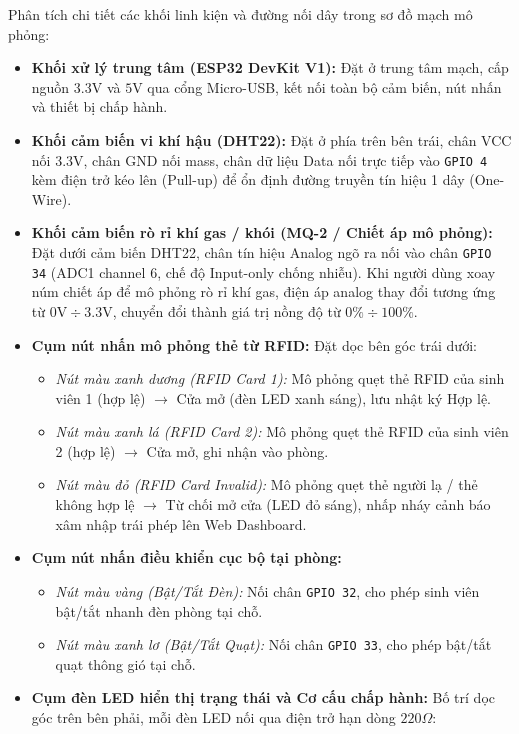 Phân tích chi tiết các khối linh kiện và đường nối dây trong sơ đồ mạch mô phỏng:
\begin{itemize}
    \item \textbf{Khối xử lý trung tâm (ESP32 DevKit V1):} Đặt ở trung tâm mạch, cấp nguồn $3.3\text{V}$ và $5\text{V}$ qua cổng Micro-USB, kết nối toàn bộ cảm biến, nút nhấn và thiết bị chấp hành.
    \item \textbf{Khối cảm biến vi khí hậu (DHT22):} Đặt ở phía trên bên trái, chân VCC nối $3.3\text{V}$, chân GND nối mass, chân dữ liệu Data nối trực tiếp vào \texttt{GPIO 4} kèm điện trở kéo lên (Pull-up) để ổn định đường truyền tín hiệu 1 dây (One-Wire).
    \item \textbf{Khối cảm biến rò rỉ khí gas / khói (MQ-2 / Chiết áp mô phỏng):} Đặt dưới cảm biến DHT22, chân tín hiệu Analog ngõ ra nối vào chân \texttt{GPIO 34} (ADC1 channel 6, chế độ Input-only chống nhiễu). Khi người dùng xoay núm chiết áp để mô phỏng rò rỉ khí gas, điện áp analog thay đổi tương ứng từ $0\text{V} \div 3.3\text{V}$, chuyển đổi thành giá trị nồng độ từ $0\% \div 100\%$.
    \item \textbf{Cụm nút nhấn mô phỏng thẻ từ RFID:} Đặt dọc bên góc trái dưới:
    \begin{itemize}
        \item \textit{Nút màu xanh dương (RFID Card 1):} Mô phỏng quẹt thẻ RFID của sinh viên 1 (hợp lệ) $\rightarrow$ Cửa mở (đèn LED xanh sáng), lưu nhật ký Hợp lệ.
        \item \textit{Nút màu xanh lá (RFID Card 2):} Mô phỏng quẹt thẻ RFID của sinh viên 2 (hợp lệ) $\rightarrow$ Cửa mở, ghi nhận vào phòng.
        \item \textit{Nút màu đỏ (RFID Card Invalid):} Mô phỏng quẹt thẻ người lạ / thẻ không hợp lệ $\rightarrow$ Từ chối mở cửa (LED đỏ sáng), nhấp nháy cảnh báo xâm nhập trái phép lên Web Dashboard.
    \end{itemize}
    \item \textbf{Cụm nút nhấn điều khiển cục bộ tại phòng:}
    \begin{itemize}
        \item \textit{Nút màu vàng (Bật/Tắt Đèn):} Nối chân \texttt{GPIO 32}, cho phép sinh viên bật/tắt nhanh đèn phòng tại chỗ.
        \item \textit{Nút màu xanh lơ (Bật/Tắt Quạt):} Nối chân \texttt{GPIO 33}, cho phép bật/tắt quạt thông gió tại chỗ.
    \end{itemize}
    \item \textbf{Cụm đèn LED hiển thị trạng thái và Cơ cấu chấp hành:} Bố trí dọc góc trên bên phải, mỗi đèn LED nối qua điện trở hạn dòng $220\Omega$:

\end{itemize}

